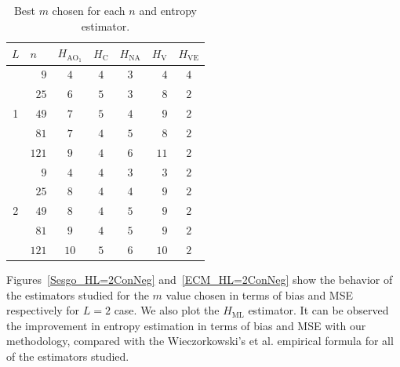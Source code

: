 \documentclass[journal]{IEEEtran}
\begin{document}
\begin{table}[htbp]
\label{tab:Mejor_m}
  \centering
  \caption{Best $m$ chosen for each $n$ and entropy estimator.}
    \begin{tabular}{crcccrc}
    \toprule
    $L$     & \multicolumn{1}{l}{$n$} & \multicolumn{1}{l}{$H_{{\text{AO}}_1}$} & \multicolumn{1}{l}{$H_\text{C}$} & \multicolumn{1}{l}{$H_{\text{NA}}$} & \multicolumn{1}{l}{$H_\text{V}$} & \multicolumn{1}{l}{$H_{\text{VE}}$} \\
    \midrule
    \multirow{5}[1]{*}{1} 
          & $9$     & $4$     & $4$     & $3$     & $4$     & $4$ \\
          & $25$    & $6$     & $5$     & $3$     & $8$     & $2$ \\
          & $49$    & $7$     & $5$     & $4$     & $9$     & $2$ \\
          & $81$    & $7$     & $4$     & $5$     & $8$     & $2$ \\
          & $121$   & $9$     & $4$     & $6$     & $11$    & $2$ \\
    \midrule
    \multirow{5}[0]{*}{2} 
          & $9$     & $4$     & $4$     & $3$     & $3$     & $2$ \\
          & $25$    & $8$     & $4$     & $4$     & $9$     & $2$ \\
          & $49$    & $8$     & $4$     & $5$     & $9$     & $2$ \\
          & $81$    & $9$     & $4$     & $5$     & $9$     & $2$ \\
          & $121$   & $10$    & $5$     & $6$     & $10$    & $2$ \\
    \bottomrule
    \end{tabular}
\end{table}


Figures~\ref{Sesgo_HL=2ConNeg} and~\ref{ECM_HL=2ConNeg} show the behavior of the estimators studied for the $m$ value chosen in terms of bias and MSE respectively for $L=2$ case. We also plot the $H_{\text{ML}}$ estimator. It can be observed the improvement in entropy estimation in terms of bias and MSE with our methodology, compared with the Wieczorkowski's et al. empirical formula for all of the estimators studied.
\end{document}
